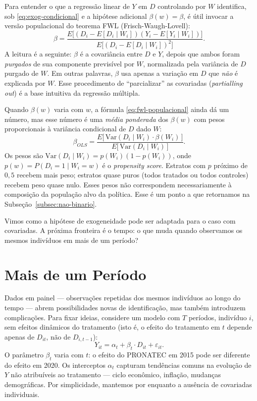 Para entender o que a regressão linear de $Y$ em $D$ controlando por $W$ identifica, sob \eqref{eq:exog-condicional} e a hipótese adicional $\beta(w) = \beta$, é útil invocar a versão populacional do teorema FWL (Frisch-Waugh-Lovell):
\begin{equation}
\beta = \frac{E\big[(D_i - E[D_i \mid W_i])(Y_i - E[Y_i \mid W_i])\big]}{E\big[(D_i - E[D_i \mid W_i])^2\big]}.
\label{eq:fwl-populacional}
\end{equation}
A leitura é a seguinte: $\beta$ é a covariância entre $D$ e $Y$, depois que ambos foram \textit{purgados} de sua componente previsível por $W$, normalizada pela variância de $D$ purgado de $W$. Em outras palavras, $\beta$ usa apenas a variação em $D$ que \textit{não} é explicada por $W$. Esse procedimento de ``parcializar'' as covariadas (\textit{partialling out}) é a base intuitiva da regressão múltipla.

Quando $\beta(w)$ varia com $w$, a fórmula \eqref{eq:fwl-populacional} ainda dá um número, mas esse número é uma \textit{média ponderada} dos $\beta(w)$ com pesos proporcionais à variância condicional de $D$ dado $W$:
\begin{equation}
\beta_{OLS} = \frac{E\big[\,\text{Var}(D_i \mid W_i) \cdot \beta(W_i)\,\big]}{E\big[\,\text{Var}(D_i \mid W_i)\,\big]}.
\label{eq:beta-ponderado}
\end{equation}
Os pesos são $\text{Var}(D_i \mid W_i) = p(W_i)(1 - p(W_i))$, onde $p(w) = P(D_i = 1 \mid W_i = w)$ é o \textit{propensity score}. Estratos com $p$ próximo de $0{,}5$ recebem mais peso; estratos quase puros (todos tratados ou todos controles) recebem peso quase nulo. Esses pesos não correspondem necessariamente à composição da população alvo da política. Esse é um ponto a que retornamos na Subseção~\ref{subsec:nao-binario}.

Vimos como a hipótese de exogeneidade pode ser adaptada para o caso com covariadas. A próxima fronteira é o tempo: o que muda quando observamos os mesmos indivíduos em mais de um período?

\section{Mais de um Período}
\label{subsec:painel}

Dados em painel --- observações repetidas dos mesmos indivíduos ao longo do tempo --- abrem possibilidades novas de identificação, mas também introduzem complicações. Para fixar ideias, considere um modelo com $T$ períodos, indivíduo $i$, sem efeitos dinâmicos do tratamento (isto é, o efeito do tratamento em $t$ depende apenas de $D_{it}$, não de $D_{i, t-1}$):
\begin{equation}
Y_{it} = \alpha_t + \beta_t \cdot D_{it} + \varepsilon_{it}.
\label{eq:modelo-painel}
\end{equation}
O parâmetro $\beta_t$ varia com $t$: o efeito do PRONATEC em 2015 pode ser diferente do efeito em 2020. Os interceptos $\alpha_t$ capturam tendências comuns na evolução de $Y$ não atribuíveis ao tratamento --- ciclo econômico, inflação, mudanças demográficas. Por simplicidade, mantemos por enquanto a ausência de covariadas individuais.

